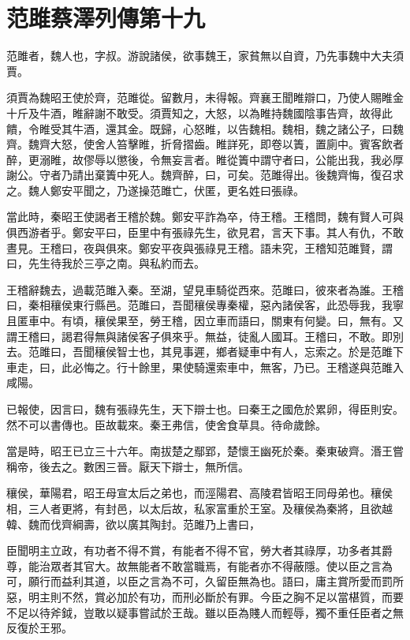\chapter{范雎蔡澤列傳第十九}

范雎者，魏人也，字叔。游說諸侯，欲事魏王，家貧無以自資，乃先事魏中大夫須賈。

須賈為魏昭王使於齊，范雎從。留數月，未得報。齊襄王聞睢辯口，乃使人賜睢金十斤及牛酒，睢辭謝不敢受。須賈知之，大怒，以為睢持魏國陰事告齊，故得此饋，令睢受其牛酒，還其金。既歸，心怒睢，以告魏相。魏相，魏之諸公子，曰魏齊。魏齊大怒，使舍人笞擊睢，折脅摺齒。睢詳死，即卷以簀，置廁中。賓客飲者醉，更溺睢，故僇辱以懲後，令無妄言者。睢從簀中謂守者曰，公能出我，我必厚謝公。守者乃請出棄簀中死人。魏齊醉，曰，可矣。范雎得出。後魏齊悔，復召求之。魏人鄭安平聞之，乃遂操范雎亡，伏匿，更名姓曰張祿。

當此時，秦昭王使謁者王稽於魏。鄭安平詐為卒，侍王稽。王稽問，魏有賢人可與俱西游者乎。鄭安平曰，臣里中有張祿先生，欲見君，言天下事。其人有仇，不敢晝見。王稽曰，夜與俱來。鄭安平夜與張祿見王稽。語未究，王稽知范雎賢，謂曰，先生待我於三亭之南。與私約而去。

王稽辭魏去，過載范雎入秦。至湖，望見車騎從西來。范雎曰，彼來者為誰。王稽曰，秦相穰侯東行縣邑。范雎曰，吾聞穰侯專秦權，惡內諸侯客，此恐辱我，我寧且匿車中。有頃，穰侯果至，勞王稽，因立車而語曰，關東有何變。曰，無有。又謂王稽曰，謁君得無與諸侯客子俱來乎。無益，徒亂人國耳。王稽曰，不敢。即別去。范雎曰，吾聞穰侯智士也，其見事遲，鄉者疑車中有人，忘索之。於是范雎下車走，曰，此必悔之。行十餘里，果使騎還索車中，無客，乃已。王稽遂與范雎入咸陽。

已報使，因言曰，魏有張祿先生，天下辯士也。曰秦王之國危於累卵，得臣則安。然不可以書傳也。臣故載來。秦王弗信，使舍食草具。待命歲餘。

當是時，昭王已立三十六年。南拔楚之鄢郢，楚懷王幽死於秦。秦東破齊。湣王嘗稱帝，後去之。數困三晉。厭天下辯士，無所信。

穰侯，華陽君，昭王母宣太后之弟也，而涇陽君、高陵君皆昭王同母弟也。穰侯相，三人者更將，有封邑，以太后故，私家富重於王室。及穰侯為秦將，且欲越韓、魏而伐齊綱壽，欲以廣其陶封。范雎乃上書曰，

臣聞明主立政，有功者不得不賞，有能者不得不官，勞大者其祿厚，功多者其爵尊，能治眾者其官大。故無能者不敢當職焉，有能者亦不得蔽隱。使以臣之言為可，願行而益利其道，以臣之言為不可，久留臣無為也。語曰，庸主賞所愛而罰所惡，明主則不然，賞必加於有功，而刑必斷於有罪。今臣之胸不足以當椹質，而要不足以待斧鉞，豈敢以疑事嘗試於王哉。雖以臣為賤人而輕辱，獨不重任臣者之無反復於王邪。

